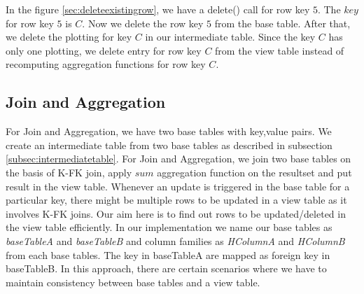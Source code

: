 \documentclass[11pt,a4paper,bibtotoc,idxtotoc,headsepline,footsepline,footexclude,BCOR12mm,DIV13]{scrbook}
\begin{document}
In the figure \ref{sec:deleteexistingrow}, we have a delete() call for row key $5$. The $key$ for row key $5$ is $C$. Now we delete the row key $5$ from the base table. After that, we delete the plotting for key $C$ in our intermediate table. Since the key $C$ has only one plotting, we delete entry for row key $C$ from the view table instead of recomputing aggregation functions for row key $C$. 

\subsection{Join and Aggregation}
\label{subsec:joinandaggregation}

For Join and Aggregation, we have two base tables with key,value pairs. We create an intermediate table from two base tables as described in subsection \ref{subsec:intermediatetable}. For Join and Aggregation, we join two base tables on the basis of K-FK join, apply $sum$ aggregation function on the resultset and put result in the view table. Whenever an update is triggered in the base table for a particular key, there might be multiple rows to be updated in a view table as it involves K-FK joins. Our aim here is to find out rows to be updated/deleted in the view table efficiently. In our implementation we name our base tables as \emph{baseTableA} and \emph{baseTableB} and column families as \emph{HColumnA} and \emph{HColumnB} from each base tables. The key in baseTableA are mapped as foreign key in baseTableB. In this approach, there are certain scenarios where we have to maintain consistency between base tables and a view table.




\end{document}
